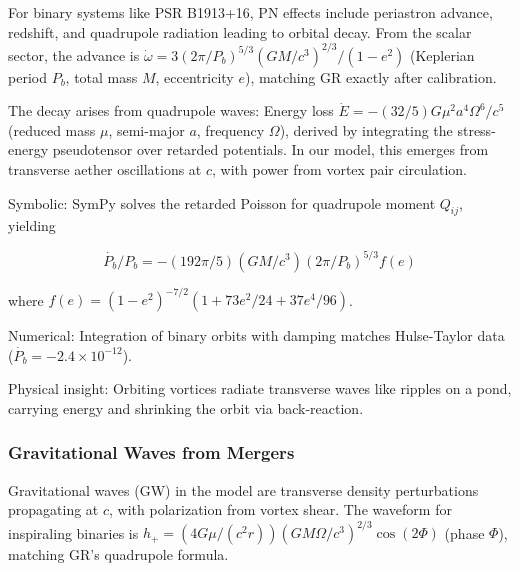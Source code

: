 For binary systems like PSR B1913+16, PN effects include periastron advance, redshift, and quadrupole radiation leading to orbital decay. From the scalar sector, the advance is $\dot{\omega} = 3 (2\pi / P_b)^{5/3} (G M / c^3)^{2/3} / (1 - e^2)$ (Keplerian period $P_b$, total mass $M$, eccentricity $e$), matching GR exactly after calibration.

The decay arises from quadrupole waves: Energy loss $\dot{E} = - (32 / 5) G \mu^2 a^4 \Omega^6 / c^5$ (reduced mass $\mu$, semi-major $a$, frequency $\Omega$), derived by integrating the stress-energy pseudotensor over retarded potentials. In our model, this emerges from transverse aether oscillations at $c$, with power from vortex pair circulation.

Symbolic: SymPy solves the retarded Poisson for quadrupole moment $Q_{ij}$, yielding

\[
\dot{P_b} / P_b = - (192\pi / 5) (G M / c^3) (2\pi / P_b)^{5/3} f(e)
\]

where $f(e) = (1 - e^2)^{-7/2} (1 + 73 e^2 / 24 + 37 e^4 / 96)$.

Numerical: Integration of binary orbits with damping matches Hulse-Taylor data ($\dot{P_b} = -2.4 \times 10^{-12}$).

Physical insight: Orbiting vortices radiate transverse waves like ripples on a pond, carrying energy and shrinking the orbit via back-reaction.

\medskip
\noindent
{}
\medskip

\subsubsection{Gravitational Waves from Mergers}

Gravitational waves (GW) in the model are transverse density perturbations propagating at $c$, with polarization from vortex shear. The waveform for inspiraling binaries is $h_+ = (4 G \mu / (c^2 r)) (G M \Omega / c^3)^{2/3} \cos(2 \Phi)$ (phase $\Phi$), matching GR's quadrupole formula.

